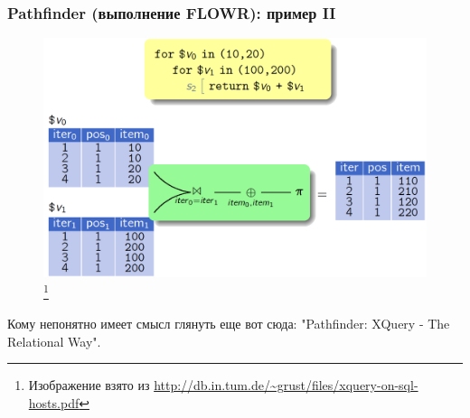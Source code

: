 \documentclass{beamer}
\begin{document}
\begin{frame}[t]
\frametitle{Pathfinder (выполнение FLOWR): пример II}

\begin{figure}[htb]
\includegraphics[width=\textwidth,height=0.63\textheight,keepaspectratio]{pathfinder2.png} 
\footnote{\tiny{Изображение взято из \url{http://db.in.tum.de/~grust/files/xquery-on-sql-hosts.pdf}}}
\end{figure}    

Кому непонятно имеет смысл глянуть еще вот сюда: "Pathfinder: XQuery - The Relational Way".
  
\end{frame}
\end{document}
